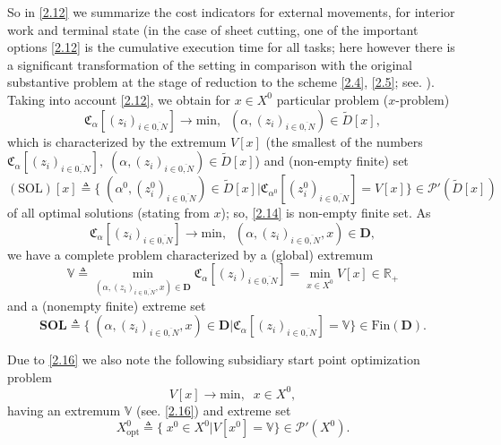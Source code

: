 \documentclass[10pt]{article}
\begin{document}
So in \eqref {2.12}
we summarize the cost indicators for external movements,
for interior work and terminal state
(in the case of sheet cutting,
one of the important options \eqref{2.12}
is the cumulative execution time for all tasks;
here however
there is a significant transformation of the setting
in comparison with the original substantive problem
at the stage of reduction to the scheme
\eqref{2.4}, \eqref{2.5};
see. \cite[$\S$3.3]{4}).
Taking into account \eqref{2.12},
we obtain for
$ x \in X ^ 0 $
particular problem
($ x $-problem)
\begin{equation}\label{2.13}
  \mathfrak{C}_{\alpha}[(z_i)_{i \in \overline{0,N}}] \longrightarrow
  \mathrm{min},\;\;(\alpha,(z_i)_{i \in \overline{0,N}}) \in \tilde{D}[x],
\end{equation}
which is characterized by the extremum
$V[x]$
(the smallest of the numbers
$\mathfrak{C}_{\alpha}[(z_i)_{i \in \overline{0,N}}],\;(\alpha,(z_i)_{i \in \overline{0,N}}) \in \tilde{D}[x]$)
and
(non-empty finite)
set
\begin{equation}\label{2.14}
  (\mathrm{SOL})[x] {\triangleq}
  \{\;(\alpha^0,(z_i^0)_{i \in \overline{0,N}}) \in \tilde{D}[x] \vert
  \mathfrak{C}_{\alpha^0}[(z_i^0)_{i \in \overline{0,N}}] = V[x]\} \in \mathcal{P}'(\tilde{D}[x])
\end{equation}
of all optimal solutions
(stating from $x$);
so,
\eqref{2.14}
is non-empty finite set.
As
\begin{equation}\label{2.15}
  \mathfrak{C}_{\alpha}[(z_i)_{i \in \overline{0,N}}] \longrightarrow
  \mathrm{min},\;\;(\alpha,(z_i)_{i \in \overline{0,N}},x) \in \mathbf{D},
\end{equation}
we have a complete problem characterized by a (global) extremum
\begin{equation}\label{2.16}
  \mathbb{V} {\triangleq}
  \min\limits_{(\alpha,(z_i)_{i \in \overline{0,N}},x) \in
  \mathbf{D}}\mathfrak{C}_{\alpha}[(z_i)_{i \in \overline{0,N}}]
  = \min\limits_{x \in X^0} V[x] \in \mathbb{R}_+
\end{equation}
and a (nonempty finite) extreme set
\begin{equation}\label{2.17}
  \mathbf{SOL} {\triangleq}
  \{\;(\alpha,(z_i)_{i \in \overline{0,N}},x) \in \mathbf{D}
  \vert \mathfrak{C}_{\alpha}[(z_i)_{i \in \overline{0,N}}] =
  \mathbb{V}\} \in \mathrm{Fin}(\mathbf{D}).
\end{equation}

Due to \eqref{2.16}
we also note the following
subsidiary
start point optimization problem
\begin{equation}\label{2.18}
  V[x] \longrightarrow \mathrm{min},\;\;x \in X^0,
\end{equation}
having an extremum
$\mathbb{V}$
(see. \eqref{2.16})
and extreme set
\begin{equation}\label{2.19}
  X^0_{\mathrm{opt}} {\triangleq} \{\;x^0 \in X^0 \vert V[x^0] = \mathbb{V}\} \in \mathcal{P}'(X^0).
\end{equation}
\end{document}
